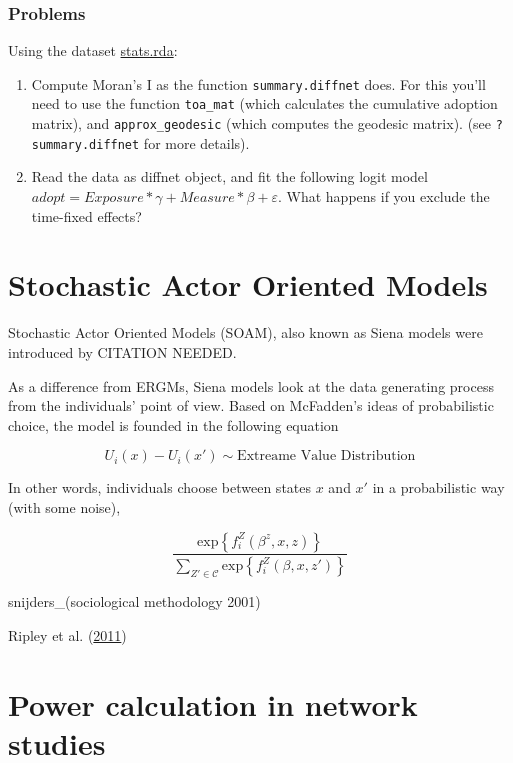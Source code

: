 \documentclass[
]{book}
\begin{document}
\hypertarget{problems-2}{%
\subsection{Problems}\label{problems-2}}

Using the dataset \url{stats.rda}:

\begin{enumerate}
\def\labelenumi{\arabic{enumi}.}
\item
  Compute Moran's I as the function \texttt{summary.diffnet} does. For this you'll need
  to use the function \texttt{toa\_mat} (which calculates the cumulative adoption matrix),
  and \texttt{approx\_geodesic} (which computes the geodesic matrix). (see \texttt{?summary.diffnet}
  for more details).
\item
  Read the data as diffnet object, and fit the following logit model \(adopt = Exposure*\gamma + Measure*\beta + \varepsilon\).
  What happens if you exclude the time-fixed effects?
\end{enumerate}

\hypertarget{stochastic-actor-oriented-models}{%
\chapter{Stochastic Actor Oriented Models}\label{stochastic-actor-oriented-models}}

Stochastic Actor Oriented Models (SOAM), also known as Siena models were introduced by CITATION NEEDED.

As a difference from ERGMs, Siena models look at the data generating process from the individuals' point of view. Based on McFadden's ideas of probabilistic choice, the model is founded in the following equation

\[
U_i(x) - U_i(x') \sim \mbox{Extreame Value Distribution}
\]

In other words, individuals choose between states \(x\) and \(x'\) in a probabilistic way (with some noise),

\[
\frac{\mbox{exp}\left\{f_i^Z(\beta^z,x, z)\right\}}{\sum_{Z'\in\mathcal{C}}\mbox{exp}\left\{f_i^{Z}(\beta, x, z')\right\}}
\]

snijders\_(sociological methodology 2001)

Ripley et al. (\protect\hyperlink{ref-Ripley2011}{2011})

\hypertarget{power-calculation-in-network-studies}{%
\chapter{Power calculation in network studies}\label{power-calculation-in-network-studies}}
\end{document}
